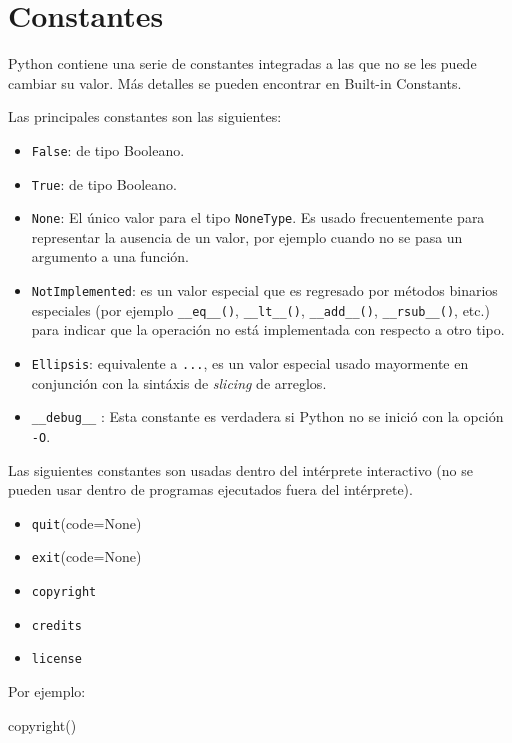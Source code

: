 \documentclass[
  spanish,
  letterpaper,
]{scrbook}
\newenvironment{Shaded}{\begin{snugshade}}{\end{snugshade}}
\newcommand{\NormalTok}[1]{\textcolor[rgb]{0.00,0.23,0.31}{#1}}
\providecommand{\tightlist}{%
  \setlength{\itemsep}{0pt}\setlength{\parskip}{0pt}}
\theoremstyle{definition}
\theoremstyle{remark}
\begin{document}
\section{Constantes}\label{constantes}

Python contiene una serie de constantes integradas a las que no se les
puede cambiar su valor. Más detalles se pueden encontrar en Built-in
Constants.

Las principales constantes son las siguientes:

\begin{itemize}
\item
  \texttt{False}: de tipo Booleano.
\item
  \texttt{True}: de tipo Booleano.
\item
  \texttt{None}: El único valor para el tipo \texttt{NoneType}. Es usado
  frecuentemente para representar la ausencia de un valor, por ejemplo
  cuando no se pasa un argumento a una función.
\item
  \texttt{NotImplemented}: es un valor especial que es regresado por
  métodos binarios especiales (por ejemplo \texttt{\_\_eq\_\_()},
  \texttt{\_\_lt\_\_()}, \texttt{\_\_add\_\_()},
  \texttt{\_\_rsub\_\_()}, etc.) para indicar que la operación no está
  implementada con respecto a otro tipo.
\item
  \texttt{Ellipsis}: equivalente a \texttt{...}, es un valor especial
  usado mayormente en conjunción con la sintáxis de \emph{slicing} de
  arreglos.
\item
  \texttt{\_\_debug\_\_} : Esta constante es verdadera si Python no se
  inició con la opción \texttt{-O}.
\end{itemize}

Las siguientes constantes son usadas dentro del intérprete interactivo
(no se pueden usar dentro de programas ejecutados fuera del intérprete).

\begin{itemize}
\tightlist
\item
  \texttt{quit}(code=None)
\item
  \texttt{exit}(code=None)
\item
  \texttt{copyright}
\item
  \texttt{credits}
\item
  \texttt{license}
\end{itemize}

Por ejemplo:

\begin{Shaded}
\begin{Highlighting}[]
\NormalTok{copyright()}
\end{Highlighting}
\end{Shaded}
\end{document}
